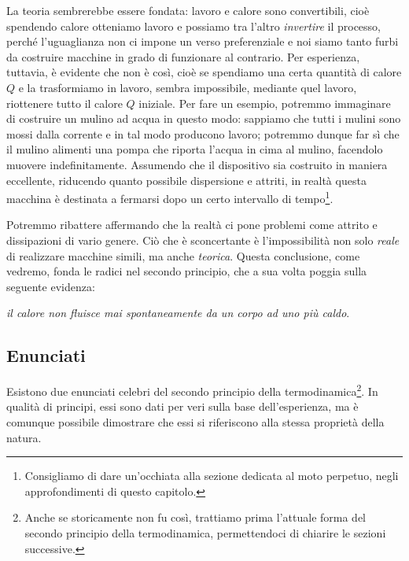 \noindent La teoria sembrerebbe essere fondata: lavoro e calore sono
convertibili, cioè spendendo calore otteniamo lavoro e possiamo tra l'altro
\textit{invertire} il processo, perché l'uguaglianza non ci impone un
verso preferenziale e noi siamo tanto furbi da costruire macchine
in grado di funzionare al contrario. Per esperienza, tuttavia, è evidente che non
è così, cioè se spendiamo una certa quantità di calore $Q$ e
la trasformiamo in lavoro, sembra impossibile, mediante quel lavoro,
riottenere tutto il calore $Q$ iniziale. Per fare un esempio, potremmo
immaginare di costruire un mulino ad acqua in questo modo: sappiamo che
tutti i mulini sono mossi dalla corrente e in tal modo producono
lavoro; potremmo dunque far sì che il mulino alimenti una pompa che
riporta l'acqua in cima al mulino, facendolo muovere indefinitamente.
Assumendo che il dispositivo sia costruito in maniera
eccellente, riducendo quanto possibile dispersione e attriti,
in realtà questa macchina è destinata a fermarsi dopo un certo
intervallo di tempo\footnote{Consigliamo di dare un'occhiata alla
sezione dedicata al moto perpetuo, negli approfondimenti di questo
capitolo.}.

Potremmo ribattere affermando che la realtà ci pone problemi come
attrito e dissipazioni di vario genere. Ciò che è sconcertante è
l'impossibilità non solo \textit{reale} di realizzare macchine simili,
ma anche \textit{teorica}. Questa conclusione, come vedremo, fonda
le radici nel secondo principio, che a sua volta poggia sulla
seguente evidenza:

\begin{center}
    \textit{il calore non fluisce \emph{mai spontaneamente} da un corpo ad uno più caldo}.
\end{center}

\subsection{Enunciati}
Esistono due enunciati celebri del secondo principio della termodinamica\footnote{Anche se storicamente non fu così, trattiamo prima l'attuale forma
del secondo principio della termodinamica, permettendoci di chiarire
le sezioni successive.}.
In qualità di principi, essi sono dati per veri sulla base dell'esperienza,
ma è comunque possibile dimostrare che essi si riferiscono alla
stessa proprietà della natura.

